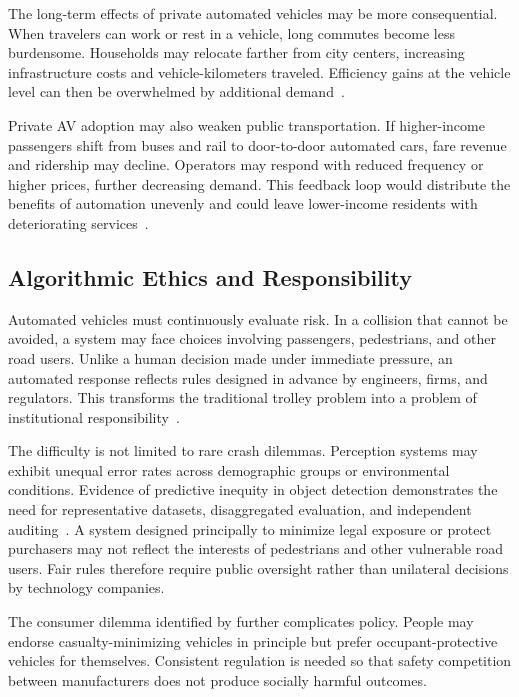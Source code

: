 \documentclass[12pt,a4paper]{article}
\begin{document}
The long-term effects of private automated vehicles may be more consequential. When travelers can work or rest in a vehicle, long commutes become less burdensome. Households may relocate farther from city centers, increasing infrastructure costs and vehicle-kilometers traveled. Efficiency gains at the vehicle level can then be overwhelmed by additional demand~\citep{litman2020,milakis2017}.

Private AV adoption may also weaken public transportation. If higher-income passengers shift from buses and rail to door-to-door automated cars, fare revenue and ridership may decline. Operators may respond with reduced frequency or higher prices, further decreasing demand. This feedback loop would distribute the benefits of automation unevenly and could leave lower-income residents with deteriorating services~\citep{milakis2017}.

\subsection{Algorithmic Ethics and Responsibility}

Automated vehicles must continuously evaluate risk. In a collision that cannot be avoided, a system may face choices involving passengers, pedestrians, and other road users. Unlike a human decision made under immediate pressure, an automated response reflects rules designed in advance by engineers, firms, and regulators. This transforms the traditional trolley problem into a problem of institutional responsibility~\citep{nyholm2016}.

The difficulty is not limited to rare crash dilemmas. Perception systems may exhibit unequal error rates across demographic groups or environmental conditions. Evidence of predictive inequity in object detection demonstrates the need for representative datasets, disaggregated evaluation, and independent auditing~\citep{wilson2019}. A system designed principally to minimize legal exposure or protect purchasers may not reflect the interests of pedestrians and other vulnerable road users. Fair rules therefore require public oversight rather than unilateral decisions by technology companies.

The consumer dilemma identified by \citet{bonnefon2016} further complicates policy. People may endorse casualty-minimizing vehicles in principle but prefer occupant-protective vehicles for themselves. Consistent regulation is needed so that safety competition between manufacturers does not produce socially harmful outcomes.
\end{document}
